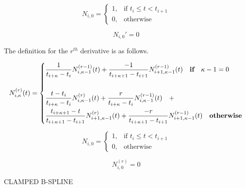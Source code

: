 \documentclass{article}
\begin{document}
 \begin{equation}
      N_{i,0} =  \begin{cases} 1, &  \text{if } t_i \leq t < t_{i+1} \\
                            0, & \text{otherwise} \end{cases}
  \end{equation}
  
  \begin{equation}
      N_{i,0}' = 0
  \end{equation}

 \hspace{1cm}
 
 The definition for the \(r^{th}\) derivative is as follows.
 
  \begin{equation} \label{eq:Basis function equation}
  N_{i,\kappa}^{(r)}(t) = \begin{dcases} 
  \frac{1}{t_{i+\kappa} - t_i} N_{i,\kappa-1}^{(r-1)}(t) +  \frac{-1}{t_{i+\kappa+1}-t_{i+1}} N_{i+1 , \kappa-1}^{(r-1)}(t) \quad \textbf{if}  \quad \kappa-1 = 0 \\ \\
  \frac{t - t_i}{t_{i+\kappa} - t_i} N_{i,\kappa-1}^{(r)}(t) + \frac{r}{t_{i+\kappa} - t_i} N_{i,\kappa-1}^{(r-1)}(t) \quad + \\
  \frac{t_{i+\kappa+1} - t}{t_{i+\kappa+1}-t_{i+1}} N_{i+1 , \kappa-1}^{(r)}(t) +  \frac{-r}{t_{i+\kappa+1}-t_{i+1}} N_{i+1 , \kappa-1}^{(r-1)}(t) \quad \textbf{otherwise} 
  \end{dcases}
  \end{equation}
  
 \begin{equation} \label{eq:Basis function equation zeros}
      N_{i,0} =  \begin{cases} 1, &  \text{if } t_i \leq t < t_{i+1} \\
                            0, & \text{otherwise} \end{cases}
  \end{equation}
  
  \begin{equation}
      N_{i,0}^{(r)} = 0
  \end{equation}

CLAMPED B-SPLINE
\end{document}

